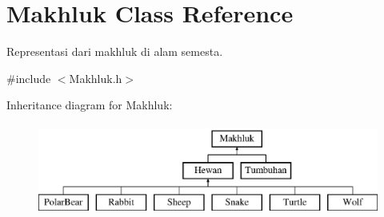 \hypertarget{class_makhluk}{}\section{Makhluk Class Reference}
\label{class_makhluk}


Representasi dari makhluk di alam semesta.  




{\ttfamily \#include $<$Makhluk.\+h$>$}

Inheritance diagram for Makhluk\+:\begin{figure}[H]
\begin{center}
\leavevmode
\includegraphics[height=3.000000cm]{class_makhluk}
\end{center}
\end{figure}
